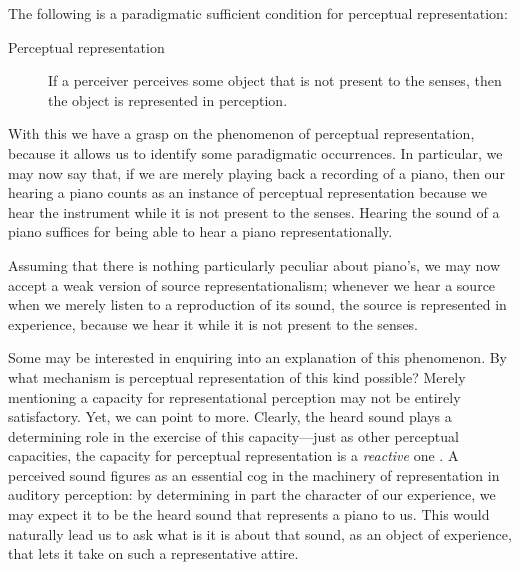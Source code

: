 \documentclass[sloppy, journal, git, bytitle, dodraft]{humapap}
\begin{document}

\sect The following is a paradigmatic sufficient condition for perceptual representation:
\begin{description}
	\item[Perceptual representation] If a perceiver perceives some object that is not present to the senses, then the object is represented in perception.
\end{description}
With this we have a grasp on the phenomenon of perceptual representation, because it allows us to identify some paradigmatic occurrences. In particular, we may now say that, if we are merely playing back a recording of a piano, then our hearing a piano counts as an instance of perceptual representation because we hear the instrument while it is not present to the senses. Hearing the sound of a piano suffices for being able to hear a piano representationally.


Assuming that there is nothing particularly peculiar about piano's, we may now accept a weak version of source representationalism; whenever we hear a source when we merely listen to a reproduction of its sound, the source is  represented in experience, because we hear it while it is not present to the senses.

Some may be interested in enquiring into an explanation of this phenomenon. By what mechanism is perceptual representation of this kind possible? Merely mentioning a capacity for representational perception may not be entirely satisfactory. Yet, we can point to more. Clearly, the heard sound plays a determining role in the exercise of this capacity---just as other perceptual capacities, the capacity for perceptual representation is a \emph{reactive} one \autocites[][]{nietzsche1887aa}[see][p. 4]{kalderon2012ab}. A perceived sound figures as an essential cog in the machinery of representation in auditory perception: by determining in part the character of our experience, we may expect it to be the heard sound that represents a piano to us. This would naturally lead us to ask what is it is about that sound, as an object of experience, that lets it take on such a representative attire.
\end{document}
